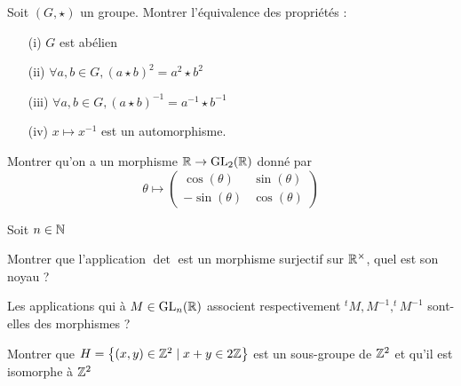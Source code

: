 \documentclass{report}
\begin{document}
\begin{exo}
    Soit \(\left(G,\star\right)\) un groupe. Montrer l'équivalence des propriétés :
    \begin{enumerate}
        \item[(i)] \(G\) est abélien
        \item[(ii)] \(\forall a,b\in G, (a\star b)^2 = a^2\star b^2\)
        \item[(iii)] \(\forall a,b\in G, (a\star b)^{-1} = a^{-1}\star b^{-1}\)
        \item[(iv)] \(x\mapsto x^{-1}\) est un automorphisme.
    \end{enumerate}
\end{exo}

\begin{exo}
    Montrer qu'on a un morphisme \(\mathbb{R}\to\text{GL}_2(\mathbb{R})\) donné par
    \[\theta \mapsto \begin{pmatrix} \cos(\theta)&\sin(\theta)\\
        -\sin(\theta)&\cos(\theta)\end{pmatrix}\]
\end{exo}

\begin{exo}
    Soit \(n\in\mathbb{N}\)
    \begin{q}{1}
        Montrer que l'application \(\det\) est un morphisme surjectif sur \(\mathbb{R}^\times\),
        quel est son noyau ?
    \end{q}
    \begin{q}{2}
        Les applications qui à \(M\in \mathrm{GL}_n(\mathbb{R})\) associent respectivement
        \(^tM, M^{-1}, ^tM^{-1}\) sont-elles des morphismes ?
    \end{q}
\end{exo}

\begin{exo}
    Montrer que \(H=\left\{ (x,y)\in\mathbb{Z}^2\mid x+y\in 2\mathbb{Z} \right\}\)
    est un sous-groupe de \(\mathbb{Z}^2\) et qu'il est isomorphe à \(\mathbb{Z}^2\)
\end{exo}
\end{document}
